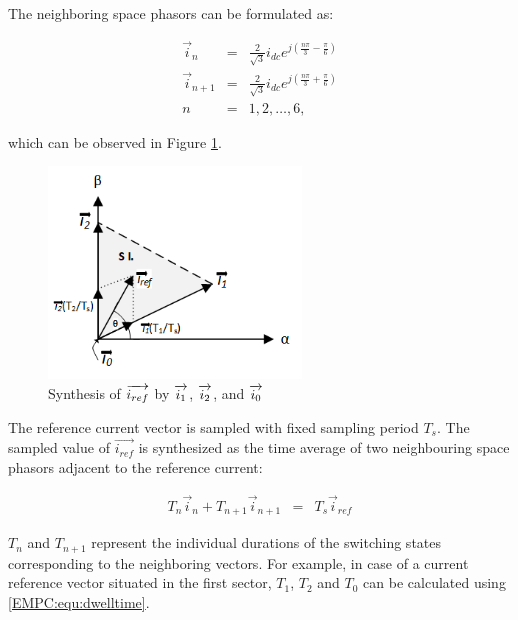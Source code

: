    The neighboring space phasors can be formulated as:

    \begin{equation}
        \begin{array}{rcl}
            \vec{i}_n&=&\frac{2}{\sqrt{3}}i_{dc}e^{j(\frac{n\pi}{3}-\frac{\pi}{6})}\\
            \vec{i}_{n+1}&=&\frac{2}{\sqrt{3}}i_{dc}e^{j(\frac{n\pi}{3}+\frac{\pi}{6})}\\
            n&=&1,2,\dots,6,
        \end{array}
        \label{EMPC:equ:neighbor}
    \end{equation}

    which can be observed in Figure \ref{EMPC:fig:OnePhasor}.

    \begin{figure}[!h]
        \centering
        \includegraphics[width=0.6\textwidth]{EMPC_PNG_Pics/OnePhasor.png}
        \caption{Synthesis of $\protect\overrightarrow{i_{ref}}$ by $\protect\overrightarrow{i_{1}}$, $\protect\overrightarrow{i_{2}}$, and $\protect\overrightarrow{i_{0}}$}
        \label{EMPC:fig:OnePhasor}
    \end{figure}

    The reference current vector is sampled with fixed sampling period $T_s$. The sampled value of $\overrightarrow{i_{ref}}$ is synthesized as the time average of two neighbouring space phasors adjacent to the reference current:

    \begin{equation}
        \begin{array}{rcl}
            T_n\vec{i}_n+T_{n+1}\vec{i}_{n+1}&=&T_s\vec{i}_{ref}
        \end{array}
        \label{EMPC:equ:i_ref}
    \end{equation}

    $T_n$ and $T_{n+1}$ represent the individual durations of the switching states corresponding to the neighboring vectors. For example, in case of a current reference vector situated in the first sector, $T_1$, $T_2$ and $T_0$ can be calculated using \ref{EMPC:equ:dwelltime}.

